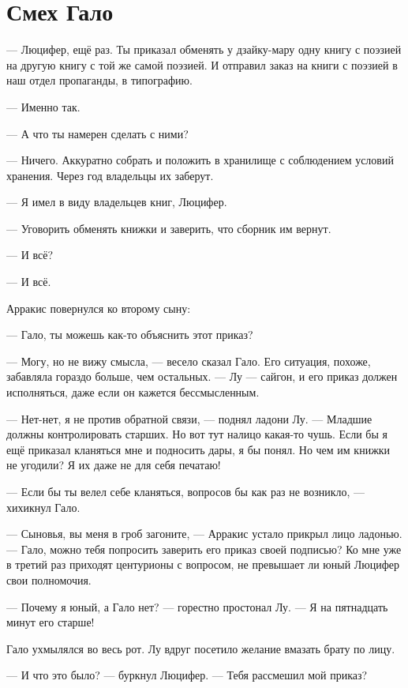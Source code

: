 \section{Смех Гало}

--- Люцифер, ещё раз.
Ты приказал обменять у дзайку-мару одну книгу с поэзией на другую книгу с той же самой поэзией.
И отправил заказ на книги с поэзией в наш отдел пропаганды, в типографию.

--- Именно так.

--- А что ты намерен сделать с ними?

--- Ничего.
Аккуратно собрать и положить в хранилище с соблюдением условий хранения.
Через год владельцы их заберут.

--- Я имел в виду владельцев книг, Люцифер.

--- Уговорить обменять книжки и заверить, что сборник им вернут.

--- И всё?

--- И всё.

Арракис повернулся ко второму сыну:

--- Гало, ты можешь как-то объяснить этот приказ?

--- Могу, но не вижу смысла, --- весело сказал Гало.
Его ситуация, похоже, забавляла гораздо больше, чем остальных.
--- Лу --- сайгон, и его приказ должен исполняться, даже если он кажется бессмысленным.

--- Нет-нет, я не против обратной связи, --- поднял ладони Лу.
--- Младшие должны контролировать старших.
Но вот тут налицо какая-то чушь.
Если бы я ещё приказал кланяться мне и подносить дары, я бы понял.
Но чем им книжки не угодили?
Я их даже не для себя печатаю!

--- Если бы ты велел себе кланяться, вопросов бы как раз не возникло, --- хихикнул Гало.

--- Сыновья, вы меня в гроб загоните, --- Арракис устало прикрыл лицо ладонью.
--- Гало, можно тебя попросить заверить его приказ своей подписью?
Ко мне уже в третий раз приходят центурионы с вопросом, не превышает ли юный Люцифер свои полномочия.

--- Почему я юный, а Гало нет? --- горестно простонал Лу.
--- Я на пятнадцать минут его старше!

Гало ухмылялся во весь рот.
Лу вдруг посетило желание вмазать брату по лицу.

\asterism

--- И что это было? --- буркнул Люцифер.
--- Тебя рассмешил мой приказ?

